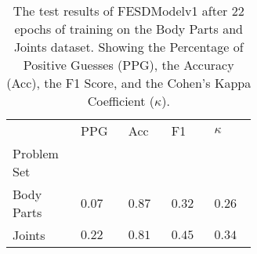     \begin{table}[!htbp]
        \caption[Test Results of FESDModelv1]{The test results of FESDModelv1 after 22 epochs of training on the Body Parts and Joints dataset. Showing the Percentage of Positive Guesses (PPG), the Accuracy (Acc), the F1 Score, and the Cohen's Kappa Coefficient ($\kappa$).}
        \label{tab:hi_res_v1}
        \centering
        \begin{tabular}{p{0.14\linewidth}p{0.12\linewidth}p{0.12\linewidth}p{0.12\linewidth}p{0.12\linewidth}}
\hline
{} &   PPG &  Acc &   F1 &  $\kappa$ \\
Problem Set   &       &        &      &           \\
\hline
Body Parts  & $0.07$ &	$0.87$ &	$0.32$ &	$0.26$ \\
Joints      & $0.22$ &	$0.81$ &	$0.45$ &	$0.34$ \\
\hline
\end{tabular}
\end{table}
  

